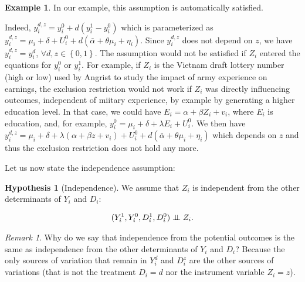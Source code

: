 \documentclass[
]{book}
\newcommand\Ind{\protect\mathpalette{\protect\independenT}{\perp}}
\def\independenT#1#2{\mathrel{\setbox0\hbox{$#1#2$}\copy0\kern-\wd0\mkern4mu\box0}}
\theoremstyle{definition}
\theoremstyle{definition}
\newtheorem{example}{Example}[chapter]
\theoremstyle{definition}
\theoremstyle{definition}
\newtheorem{hypothesis}{Hypothesis}[chapter]
\theoremstyle{remark}
\newtheorem*{remark}{Remark}
\begin{document}
\begin{example}
\protect\hypertarget{exm:unnamed-chunk-141}{}{\label{exm:unnamed-chunk-141} }In our example, this assumption is automatically satisfied.
\end{example}
Indeed, \(y_i^{d,z}=y_i^0 + d(y_i^1-y_i^0)\) which is parameterized as \(y_i^{d,z}=\mu_i+\delta+U_i^0+d(\bar{\alpha}+\theta\mu_i+\eta_i)\).
Since \(y_i^{d,z}\) does not depend on \(z\), we have \(y_i^{d,z} = y_i^d\), \(\forall d,z \in \left\{0,1\right\}\).
The assumption would not be satisfied if \(Z_i\) entered the equations for \(y_i^0\) or \(y_i^1\).
For example, if \(Z_i\) is the Vietnam draft lottery number (high or low) used by Angrist to study the impact of army experience on earnings, the exclusion restriction would not work if \(Z_i\) was directly influencing outcomes, independent of miitary experience, by example by generating a higher education level.
In that case, we could have \(E_i=\alpha+\beta Z_i + v_i\), where \(E_i\) is education, and, for example, \(y_i^0=\mu_i+\delta+\lambda E_i+U_i^0\).
We then have \(y_i^{d,z}=\mu_i+\delta +\lambda(\alpha+\beta z + v_i) +U_i^0+d(\bar{\alpha}+\theta\mu_i+\eta_i)\) which depends on \(z\) and thus the exclusion restriction does not hold any more.

Let us now state the independence assumption:

\begin{hypothesis}[Independence]
\protect\hypertarget{hyp:Independence}{}{\label{hyp:Independence} \iffalse (Independence) \fi{} }We assume that \(Z_i\) is independent from the other determinants of \(Y_i\) and \(D_i\):

\begin{align*}
(Y_i^1,Y_i^0,D_i^1,D_i^0)\Ind Z_i.
\end{align*}
\end{hypothesis}

\begin{remark}
\iffalse{} {Remark. } \fi{}Why do we say that independence from the potential outcomes is the same as independence from the other determinants of \(Y_i\) and \(D_i\)?
Because the only sources of variation that remain in \(Y_i^d\) and \(D_i^z\) are the other sources of variations (that is not the treatment \(D_i=d\) nor the instrument variable \(Z_i=z\)).
\end{remark}
\end{document}
